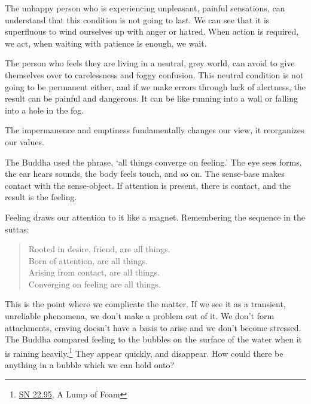 The unhappy person who is experiencing unpleasant, painful sensations,
can understand that this condition is not going to last. We can see that
it is superfluous to wind ourselves up with anger or hatred. When action
is required, we act, when waiting with patience is enough, we wait.

The person who feels they are living in a neutral, grey world, can avoid
to give themselves over to carelessness and foggy confusion. This
neutral condition is not going to be permanent either, and if we make
errors through lack of alertness, the result can be painful and
dangerous. It can be like running into a wall or falling into a hole in
the fog.

The impermanence and emptiness fundamentally changes our view, it
reorganizes our values.

The Buddha used the phrase, `all things converge on feeling.' The eye
sees forms, the ear hears sounds, the body feels touch, and so on. The
sense-base makes contact with the sense-object. If attention is present,
there is contact, and the result is the feeling.

Feeling draws our attention to it like a magnet. Remembering the
sequence in the suttas:

\begin{quote}
Rooted in desire, friend, are all things.\\
Born of attention, are all things.\\
Arising from contact, are all things.\\
Converging on feeling are all things.

\bigskip

\end{quote}


This is the point where we complicate the matter. If we see it as a
transient, unreliable phenomena, we don't make a problem out of it. We
don't form attachments, craving doesn't have a basis to arise and we
don't become stressed. The Buddha compared feeling to the bubbles on the
surface of the water when it is raining heavily.\footnote{\href{https://suttacentral.net/sn22.95}{SN
  22.95}, A Lump of Foam} They appear quickly, and disappear. How could
there be anything in a bubble which we can hold onto?

